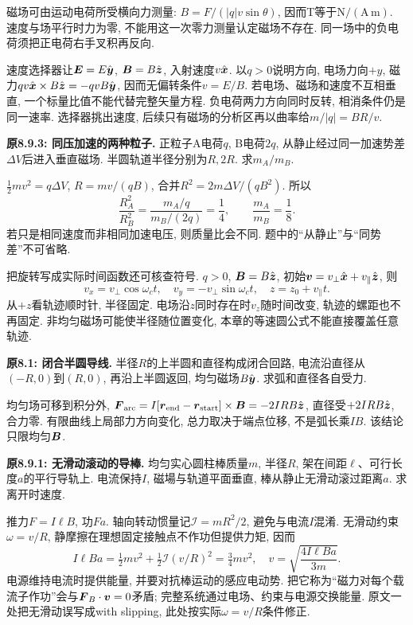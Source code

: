 \label{tb:selector}
磁场可由运动电荷所受横向力测量: $B=F/(|q|v\sin\theta)$, 因而T等于$\mathrm{N/(A\,m)}$. 速度与场平行时力为零, 不能用这一次零力测量认定磁场不存在. 同一场中的负电荷须把正电荷右手叉积再反向.

速度选择器让$\boldsymbol{E}=E\hat{\boldsymbol{y}}$, $\boldsymbol{B}=B\hat{\boldsymbol{z}}$, 入射速度$v\hat{\boldsymbol{x}}$. 以$q>0$说明方向, 电场力向$+y$, 磁力$qv\hat{\boldsymbol{x}}\times B\hat{\boldsymbol{z}}=-qvB\hat{\boldsymbol{y}}$, 因而无偏转条件$v=E/B$. 若电场、磁场和速度不互相垂直, 一个标量比值不能代替完整矢量方程. 负电荷两力方向同时反转, 相消条件仍是同一速率. 选择器挑出速度, 后续只有磁场的分析区再以曲率给$m/|q|=BR/v$.

\begin{example}
\textbf{原8.9.3: 同压加速的两种粒子.} 
正粒子A电荷$q$, B电荷$2q$, 从静止经过同一加速势差$\Delta V$后进入垂直磁场. 半圆轨道半径分别为$R,2R$. 求$m_A/m_B$.
\end{example}
\begin{solution}
$\tfrac12mv^2=q\Delta V$, $R=mv/(qB)$, 合并$R^2=2m\Delta V/(qB^2)$. 所以
\[\frac{R_A^2}{R_B^2}=\frac{m_A/q}{m_B/(2q)}=\frac14,\qquad \frac{m_A}{m_B}=\frac18.\]
若只是相同速度而非相同加速电压, 则质量比会不同. 题中的“从静止”与“同势差”不可省略.
\end{solution}

把旋转写成实际时间函数还可核查符号. $q>0$, $\boldsymbol{B}=B\hat{\boldsymbol{z}}$, 初始$\boldsymbol{v}=v_\perp\hat{\boldsymbol{x}}+v_\parallel\hat{\boldsymbol{z}}$, 则
\[v_x=v_\perp\cos\omega_ct,\quad v_y=-v_\perp\sin\omega_ct,\quad z=z_0+v_\parallel t.\]
从$+z$看轨迹顺时针, 半径固定. 电场沿$z$同时存在时$v_z$随时间改变, 轨迹的螺距也不再固定. 非均匀磁场可能使半径随位置变化, 本章的等速圆公式不能直接覆盖任意轨迹.

\label{tb:rod-magnetic}
\begin{example}
\textbf{原8.1: 闭合半圆导线.} 
半径$R$的上半圆和直径构成闭合回路, 电流沿直径从$(-R,0)$到$(R,0)$, 再沿上半圆返回, 均匀磁场$B\hat{\boldsymbol{y}}$. 求弧和直径各自受力.
\end{example}
\begin{solution}
均匀场可移到积分外, $\boldsymbol{F}_{\rm arc}=I[\boldsymbol{r}_{\rm end}-\boldsymbol{r}_{\rm start}]\times\boldsymbol{B}=-2IRB\hat{\boldsymbol{z}}$, 直径受$+2IRB\hat{\boldsymbol{z}}$, 合力零. 有限曲线上局部力方向变化, 总力取决于端点位移, 不是弧长乘$I B$. 该结论只限均匀$\boldsymbol{B}$.
\end{solution}

\begin{example}
\textbf{原8.9.1: 无滑动滚动的导棒.} 
均匀实心圆柱棒质量$m$, 半径$R$, 架在间距$\ell$、可行长度$a$的平行导轨上. 电流保持$I$, 磁場与轨道平面垂直, 棒从静止无滑动滚过距离$a$. 求离开时速度.
\end{example}
\begin{solution}
推力$F=I\ell B$, 功$Fa$. 轴向转动惯量记$\mathcal I=mR^2/2$, 避免与电流$I$混淆. 无滑动约束$\omega=v/R$, 静摩擦在理想固定接触点不作功但提供力矩, 因而
\[I\ell Ba=\tfrac12mv^2+\tfrac12\mathcal I(v/R)^2=\tfrac34mv^2,
\quad v=\sqrt{\frac{4I\ell Ba}{3m}}.\]
电源维持电流时提供能量, 并要对抗棒运动的感应电动势. 把它称为“磁力对每个载流子作功”会与$\boldsymbol{F}_B\cdot\boldsymbol{v}=0$矛盾; 完整系统通过电场、约束与电源交换能量. 原文一处把无滑动误写成with slipping, 此处按实际$\omega=v/R$条件修正.
\end{solution}

